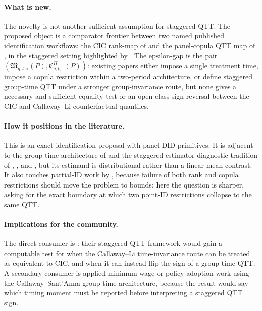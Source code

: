 \documentclass[11pt]{article}
\theoremstyle{definition}
\theoremstyle{plain}
\theoremstyle{remark}
\begin{document}
\paragraph{What is new.}
The novelty is not another sufficient assumption for staggered QTT. The proposed object is a comparator frontier between two named published identification workflows: the CIC rank-map of \citet[Sections 2--3, especially the counterfactual-distribution construction around their equations (2.4)--(2.6)]{AtheyImbens2006} and the panel-copula QTT map of \citet[Sections 2--3, especially the copula/time-invariance restrictions defining their counterfactual change distribution]{CallawayLi2019}, in the staggered setting highlighted by \citet[abstract and concluding discussion]{LiLin2024}. The epsilon-gap is the pair \((\mathfrak M_{g,t,\tau}(P),\mathfrak C^{\Pi}_{g,t,\tau}(P))\): existing papers either impose a single treatment time, impose a copula restriction within a two-period architecture, or define staggered group-time QTT under a stronger group-invariance route, but none gives a necessary-and-sufficient equality test or an open-class sign reversal between the CIC and Callaway--Li counterfactual quantiles.

\paragraph{How it positions in the literature.}
This is an exact-identification proposal with panel-DID primitives. It is adjacent to the group-time architecture of \citet{CallawaySantAnna2021} and the staggered-estimator diagnostic tradition of \citet{GoodmanBacon2021}, \citet{SunAbraham2021}, and \citet{deChaisemartinDHaultfoeuille2020}, but its estimand is distributional rather than a linear mean contrast. It also touches partial-ID work by \citet{FanYu2012}, because failure of both rank and copula restrictions should move the problem to bounds; here the question is sharper, asking for the exact boundary at which two point-ID restrictions collapse to the same QTT.

\paragraph{Implications for the community.}
The direct consumer is \citet{LiLin2024}: their staggered QTT framework would gain a computable test for when the Callaway--Li time-invariance route can be treated as equivalent to CIC, and when it can instead flip the sign of a group-time QTT. A secondary consumer is applied minimum-wage or policy-adoption work using the Callaway--Sant'Anna group-time architecture, because the result would say which timing moment must be reported before interpreting a staggered QTT sign.
\end{document}
